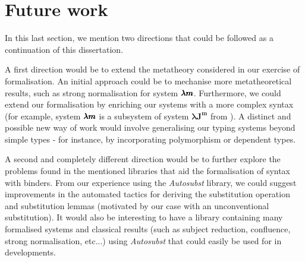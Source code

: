 \section{Future work}

In this last section, we mention two directions that could be followed as a continuation of this dissertation.


A first direction would be to extend the metatheory considered in our exercise of formalisation.
An initial approach could be to mechanise more metatheoretical results, such as strong normalisation for system $\pmb{\lambda m}$.
Furthermore, we could extend our formalisation by enriching our systems with a more complex syntax (for example, system $\pmb{\lambda m}$ is a subsystem of system $\pmb{\lambda J^m}$ from \cite{JCESLuis}).
A distinct and possible new way of work would involve generalising our typing systems beyond simple types - for instance, by incorporating polymorphism or dependent types.

A second and completely different direction would be to further explore the problems found in the mentioned libraries that aid the formalisation of syntax with binders.
From our experience using the \textit{Autosubst} library, we could suggest improvements in the automated tactics for deriving the substitution operation and substitution lemmas (motivated by our case with an unconventional substitution).
It would also be interesting to have a library containing many formalised systems and classical results (such as subject reduction, confluence, strong normalisation, etc...) using \textit{Autosubst} that could easily be used for in developments.

